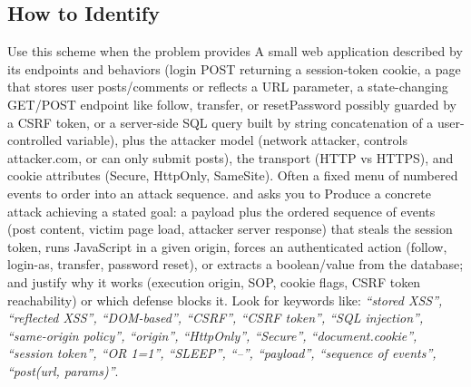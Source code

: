 \documentclass[12pt, a4paper]{article}
\begin{document}
\subsection*{How to Identify}
Use this scheme when the problem provides A small web application described by its endpoints and behaviors (login POST returning a session-token cookie, a page that stores user posts/comments or reflects a URL parameter, a state-changing GET/POST endpoint like follow, transfer, or resetPassword possibly guarded by a CSRF token, or a server-side SQL query built by string concatenation of a user-controlled variable), plus the attacker model (network attacker, controls attacker.com, or can only submit posts), the transport (HTTP vs HTTPS), and cookie attributes (Secure, HttpOnly, SameSite). Often a fixed menu of numbered events to order into an attack sequence. and asks you to Produce a concrete attack achieving a stated goal: a payload plus the ordered sequence of events (post content, victim page load, attacker server response) that steals the session token, runs JavaScript in a given origin, forces an authenticated action (follow, login-as, transfer, password reset), or extracts a boolean/value from the database; and justify why it works (execution origin, SOP, cookie flags, CSRF token reachability) or which defense blocks it. Look for keywords like: \textit{``stored XSS'', ``reflected XSS'', ``DOM-based'', ``CSRF'', ``CSRF token'', ``SQL injection'', ``same-origin policy'', ``origin'', ``HttpOnly'', ``Secure'', ``document.cookie'', ``session token'', ``OR 1=1'', ``SLEEP'', ``--'', ``payload'', ``sequence of events'', ``post(url, params)''}.
\end{document}
